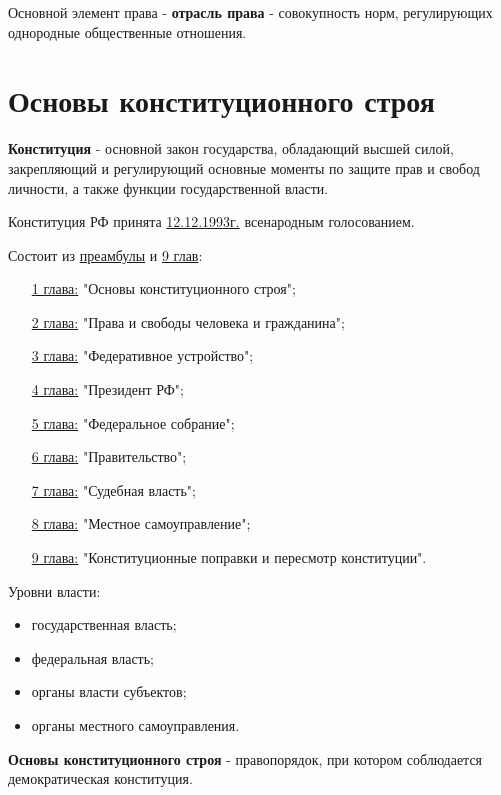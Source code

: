 \documentclass[a5paper,10pt]{article}
\begin{document}
			Основной элемент права - \textbf{отрасль права} - совокупность норм, регулирующих однородные общественные отношения.
	
	\section{Основы конституционного строя}
		\textbf{Конституция} - основной закон государства, обладающий высшей силой, закрепляющий и регулирующий основные моменты по защите прав и свобод личности, а также функции государственной власти.

		\begin{framed}
			Конституция РФ принята \underline{12.12.1993г.} всенародным голосованием.
		\end{framed}

		Состоит из \underline{преамбулы} и \underline{9 глав}:
		\begin{itemize}[itemsep=0pt]
			\item[\underline{1 глава:}] "Основы конституционного строя";
			\item[\underline{2 глава:}] "Права и свободы человека и гражданина";
			\item[\underline{3 глава:}] "Федеративное устройство";
			\item[\underline{4 глава:}] "Президент РФ";
			\item[\underline{5 глава:}] "Федеральное собрание";
			\item[\underline{6 глава:}] "Правительство";
			\item[\underline{7 глава:}] "Судебная власть";
			\item[\underline{8 глава:}] "Местное самоуправление";
			\item[\underline{9 глава:}] "Конституционные поправки и пересмотр конституции".
		\end{itemize}

		\begin{framed}
			Уровни власти:
			\begin{itemize}[itemsep=0pt]
				\item государственная власть;
				\item федеральная власть;
				\item органы власти субъектов;
				\item органы местного самоуправления.
			\end{itemize}
		\end{framed}

		\textbf{Основы конституционного строя} - правопорядок, при котором соблюдается демократическая конституция.
\end{document}
